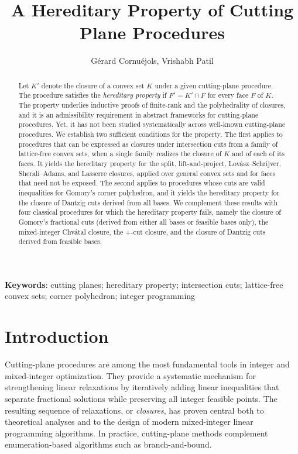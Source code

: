 \documentclass{article}
\title{A Hereditary Property of Cutting Plane Procedures\vspace{-0em}}
\author{G\'erard Cornu\'ejols, Vrishabh Patil}
\begin{document}
\maketitle

\begin{abstract}
     \noindent Let $K'$ denote the closure of a convex set $K$ under a given cutting-plane procedure. The procedure satisfies the \emph{hereditary property} if $F' = K' \cap F$ for every face $F$ of $K$. The property underlies inductive proofs of finite-rank and the polyhedrality of closures, and it is an admissibility requirement in abstract frameworks for cutting-plane procedures. Yet, it has not been studied systematically across well-known cutting-plane procedures. We establish two sufficient conditions for the property. The first applies to procedures that can be expressed as closures under intersection cuts from a family of lattice-free convex sets, when a single family realizes the closure of $K$ and of each of its faces. It yields the hereditary property for the split, lift-and-project, Lov\'asz--Schrijver, Sherali--Adams, and Lasserre closures, applied over general convex sets and for faces that need not be exposed. The second applies to procedures whose cuts are valid inequalities for Gomory's corner polyhedron, 
     and it yields the hereditary property for the closure of Dantzig cuts derived from all bases. We complement these results with four classical procedures for which the hereditary property fails, namely the closure of Gomory's fractional cuts (derived from either all bases or feasible bases only), the mixed-integer Chv\'atal closure, the $+$-cut closure, and the closure of Dantzig cuts derived from feasible bases. 
\end{abstract}

\noindent\textbf{Keywords}: cutting planes; hereditary property; intersection cuts; lattice-free convex sets; corner polyhedron; integer programming

\section{Introduction}\label{sec:intro}

Cutting-plane procedures are among the most fundamental tools in integer and mixed-integer optimization. They provide a systematic mechanism for strengthening linear relaxations by iteratively adding linear inequalities that separate fractional solutions while preserving all integer feasible points. The resulting sequence of relaxations, or \emph{closures}, has proven central both to theoretical analyses and to the design of modern mixed-integer linear programming algorithms. In practice, cutting-plane methods complement enumeration-based algorithms such as branch-and-bound.
\end{document}
